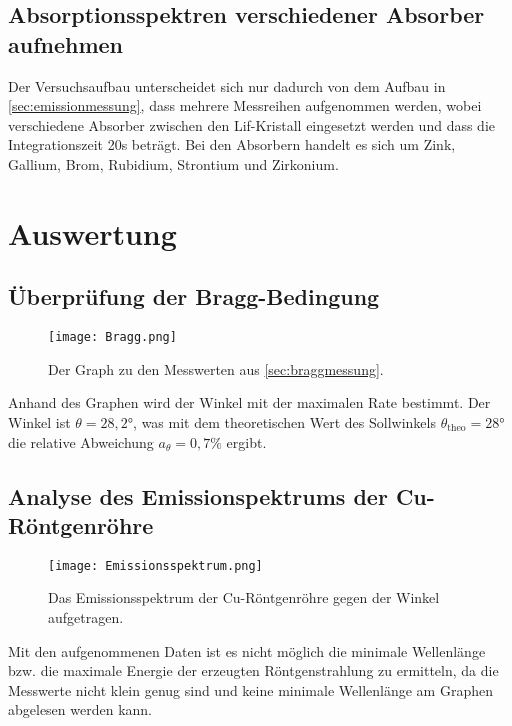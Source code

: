 \documentclass[titlepage = firstcover]{scrartcl}
\begin{document}
      \subsection{Absorptionsspektren verschiedener Absorber aufnehmen}
        Der Versuchsaufbau unterscheidet sich nur dadurch von dem Aufbau in \autoref{sec:emissionmessung}, dass mehrere Messreihen aufgenommen werden, wobei verschiedene Absorber zwischen den Lif-Kristall eingesetzt werden und dass die Integrationszeit 20s beträgt.
        Bei den Absorbern handelt es sich um Zink, Gallium, Brom, Rubidium, Strontium und Zirkonium.
    
    \newpage
    \section{Auswertung}
      \subsection{Überprüfung der Bragg-Bedingung} \label{sec:braggauswertung}
        \begin{figure}[h]
          \centering
          \texttt{[image: Bragg.png]}
          \caption{Der Graph zu den Messwerten aus \autoref{sec:braggmessung}.}
          \label{fig:bragg}
        \end{figure}
        \FloatBarrier

        Anhand des Graphen wird der Winkel mit der maximalen Rate bestimmt. Der Winkel ist $\theta = 28,2°$, was mit dem theoretischen Wert des Sollwinkels $\theta_\text{theo} = 28°$ die relative Abweichung $a_{\theta} = 0,7 \%$ ergibt.
      
      \newpage
      \subsection{Analyse des Emissionspektrums der Cu-Röntgenröhre}
        \begin{figure}[h]
          \centering
          \texttt{[image: Emissionsspektrum.png]}
          \caption{Das Emissionsspektrum der Cu-Röntgenröhre gegen der Winkel aufgetragen.}
          \label{fig:emissionCu}
        \end{figure}
        \FloatBarrier

        Mit den aufgenommenen Daten ist es nicht möglich die minimale Wellenlänge bzw. die maximale Energie der erzeugten Röntgenstrahlung zu ermitteln, da die Messwerte nicht klein genug sind und keine minimale Wellenlänge am Graphen abgelesen werden kann.
\end{document}
